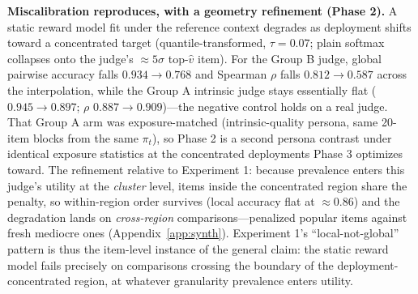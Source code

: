 ﻿\documentclass[11pt]{article}
\begin{document}
\textbf{Miscalibration reproduces, with a geometry refinement (Phase 2).} A static reward model fit under the reference context degrades as deployment shifts toward a concentrated target (quantile-transformed, \(\tau = 0.07\); plain softmax collapses onto the judge's \(\approx 5\sigma\) top-\(\hat v\) item). For the Group B judge, global pairwise accuracy falls \(0.934 \to 0.768\) and Spearman \(\rho\) falls \(0.812 \to 0.587\) across the interpolation, while the Group A intrinsic judge stays essentially flat (\(0.945 \to 0.897\); \(\rho\) \(0.887 \to 0.909\))---the negative control holds on a real judge. That Group A arm was exposure-matched (intrinsic-quality persona, same 20-item blocks from the same \(\pi_t\)), so Phase 2 is a second persona contrast under identical exposure statistics at the concentrated deployments Phase 3 optimizes toward. The refinement relative to Experiment 1: because prevalence enters this judge's utility at the \emph{cluster} level, items inside the concentrated region share the penalty, so within-region order survives (local accuracy flat at \(\approx 0.86\)) and the degradation lands on \emph{cross-region} comparisons---penalized popular items against fresh mediocre ones (Appendix~\ref{app:synth}). Experiment 1's ``local-not-global'' pattern is thus the item-level instance of the general claim: the static reward model fails precisely on comparisons crossing the boundary of the deployment-concentrated region, at whatever granularity prevalence enters utility.
\end{document}
